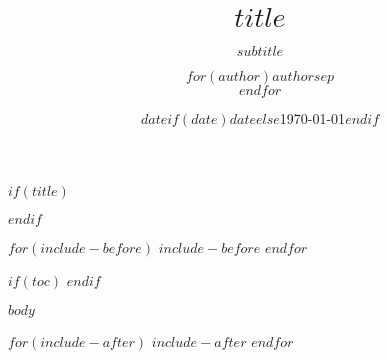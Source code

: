 \documentclass[$if(fontsize)$$fontsize$,$endif$$if(lang)$$babel-lang$,$endif$$if(papersize)$$papersize$paper,$endif$$for(classoption)$$classoption$$sep$,$endfor$]{$documentclass$}
\title{$title$}
\title{}
\subtitle{$subtitle$}
\author{$for(author)$$author$$sep$ \\ $endfor$}
\author{}
\date{$date$}
\date{}
\date{$if(date)$$date$$else$\today$endif$}
\theoremstyle{urcastyle}
\theoremstyle{remark}
\begin{document}

\newtheorem{lemme}{Lemme}[section]
\newtheorem{theoreme}{Théorème}[section]
\newtheorem{corollaire}{Corollaire}[section]
\newtheorem{propriete}{Propriété}[section]
\newtheorem{proprietes}{Propriétés}[section]



$if(title)$
\maketitle
$endif$

% 

$for(include-before)$
  $include-before$
$endfor$

\vspace{1cm}

$if(toc)$
  {
  \hypersetup{linkcolor=black}
  \setcounter{tocdepth}{$toc-depth$}
  \pagebreak
  \tableofcontents
  }
$endif$

\pagebreak
\normalsize



$body$


$for(include-after)$
$include-after$
$endfor$

\pagebreak
\listoffigures
\end{document}
